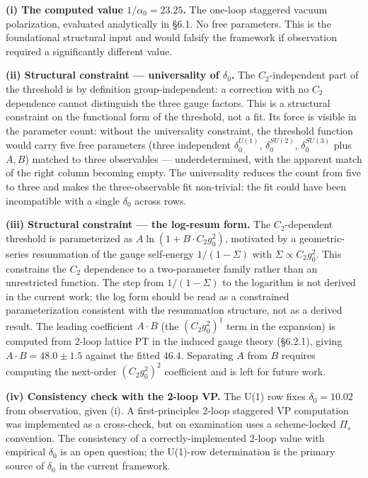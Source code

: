 \documentclass[
]{article}
\begin{document}
\textbf{(i) The computed value \(1/\alpha_0 = 23.25\).} The one-loop
staggered vacuum polarization, evaluated analytically in §6.1. No free
parameters. This is the foundational structural input and would falsify
the framework if observation required a significantly different value.

\textbf{(ii) Structural constraint --- universality of \(\delta_0\).}
The \(C_2\)-independent part of the threshold is by definition
group-independent: a correction with no \(C_2\) dependence cannot
distinguish the three gauge factors. This is a structural constraint on
the functional form of the threshold, not a fit. Its force is visible in
the parameter count: without the universality constraint, the threshold
function would carry five free parameters (three independent
\(\delta_0^{U(1)}\), \(\delta_0^{SU(2)}\), \(\delta_0^{SU(3)}\) plus
\(A, B\)) matched to three observables --- underdetermined, with the
apparent match of the right column becoming empty. The universality
reduces the count from five to three and makes the three-observable fit
non-trivial: the fit could have been incompatible with a single
\(\delta_0\) across rows.

\textbf{(iii) Structural constraint --- the log-resum form.} The
\(C_2\)-dependent threshold is parameterized as
\(A\ln(1 + B \cdot C_2 g_0^2)\), motivated by a geometric-series
resummation of the gauge self-energy \(1/(1-\Sigma)\) with
\(\Sigma \propto C_2 g_0^2\). This constrains the \(C_2\) dependence to
a two-parameter family rather than an unrestricted function. The step
from \(1/(1-\Sigma)\) to the logarithm is not derived in the current
work; the log form should be read as a constrained parameterization
consistent with the resummation structure, not as a derived result. The
leading coefficient \(A \cdot B\) (the \((C_2 g_0^2)^1\) term in the
expansion) is computed from 2-loop lattice PT in the induced gauge
theory (§6.2.1), giving \(A \cdot B = 48.0 \pm 1.5\) against the fitted
\(46.4\). Separating \(A\) from \(B\) requires computing the next-order
\((C_2 g_0^2)^2\) coefficient and is left for future work.

\textbf{(iv) Consistency check with the 2-loop VP.} The U(1) row fixes
\(\delta_0 = 10.02\) from observation, given (i). A first-principles
2-loop staggered VP computation was implemented as a cross-check, but on
examination uses a scheme-locked \(\Pi_s\) convention. The consistency
of a correctly-implemented 2-loop value with empirical \(\delta_0\) is
an open question; the U(1)-row determination is the primary source of
\(\delta_0\) in the current framework.
\end{document}
